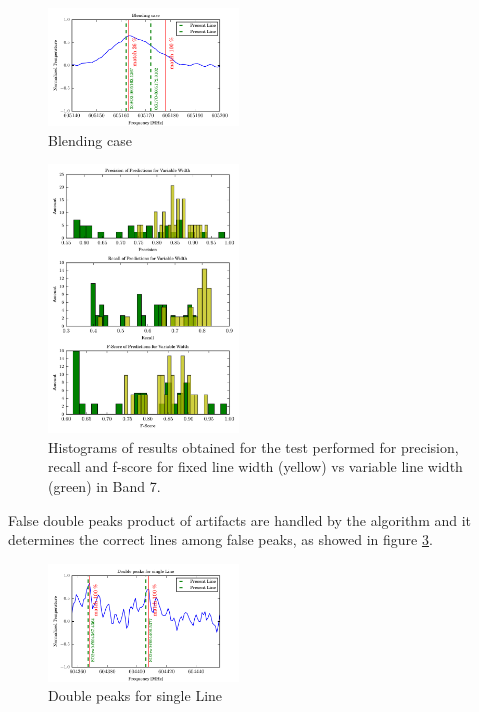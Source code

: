 \begin{figure}[H]
	\begin{center}
		\includegraphics[width=0.45\textwidth]{images/blending}
		\caption{ Blending case }
		\label{fig:blending}
	\end{center}
\end{figure}

\begin{figure}[H]
	\begin{center}
		\includegraphics[width=0.45\textwidth]{images/hist2}
		\caption{ Histograms of results obtained for the test performed for precision, recall and f-score for fixed line width (yellow) vs variable line width (green) in Band 7.}
		\label{fig:hist2}
	\end{center}
\end{figure}


False double peaks product of artifacts are handled by the algorithm and it determines the correct lines among false peaks, as showed in figure \ref{fig:doublepeak}.

\begin{figure}[H]
	\begin{center}
		\includegraphics[width=0.45\textwidth]{images/doublepeak}
		\caption{ Double peaks for single Line }
		\label{fig:doublepeak}
	\end{center}
\end{figure}